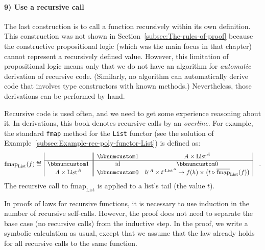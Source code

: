 \paragraph{9) Use a recursive call}

The last construction is to call a function recursively within its
own definition. This construction was not shown in Section~\ref{subsec:The-rules-of-proof}
because the constructive propositional logic (which was the main focus
in that chapter) cannot represent a recursively defined value. However,
this limitation of propositional logic means only that we do not have
an algorithm for \emph{automatic} derivation of recursive code. (Similarly,
no algorithm can automatically derive code that involves type constructors
with known methods.) Nevertheless, those derivations can be performed
by hand. 

Recursive code is used often, and we need to get some experience reasoning
about it. In derivations, this book denotes recursive calls by an
\emph{overline}. For example, the standard \lstinline!fmap! method
for the \lstinline!List! functor (see the solution of Example~\ref{subsec:Example-rec-poly-functor-List})
is defined as:
\[
\text{fmap}_{\text{List}}(f)\triangleq\,\begin{array}{|c||cc|}
 & \bbnum 1 & A\times\text{List}^{A}\\
\hline \bbnum 1 & \text{id} & \bbnum 0\\
A\times\text{List}^{A} & \bbnum 0 & h^{:A}\times t^{:\text{List}^{A}}\rightarrow f(h)\times\big(t\triangleright\overline{\text{fmap}}_{\text{List}}(f)\big)
\end{array}\quad.
\]
The recursive call to $\text{fmap}_{\text{List}}$ is applied to a
list\textsf{'}s tail (the value $t$).

In proofs of laws for recursive functions, it is necessary to use
induction in the number of recursive self-calls. However, the proof
does not need to separate the base case (no recursive calls) from
the inductive step. In the proof, we write a symbolic calculation
as usual, except that we assume that the law already holds for all
recursive calls to the same function.

